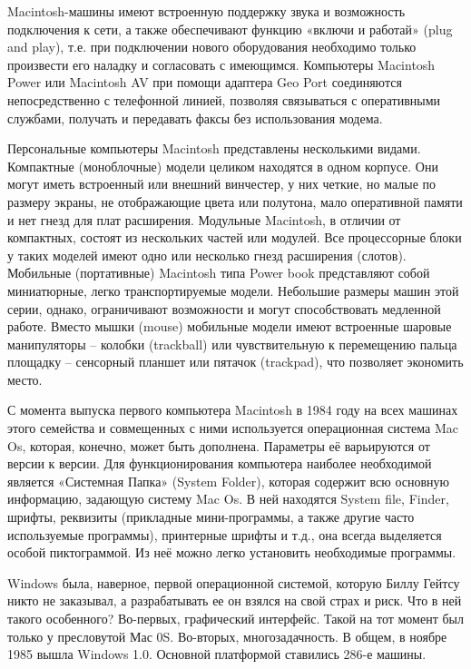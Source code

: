 Macintosh-машины имеют встроенную поддержку звука и возможность подключения к сети, а также обеспечивают функцию «включи и работай» (plug and play), т.е. при подключении нового оборудования необходимо только произвести его наладку и согласовать с имеющимся. Компьютеры Macintosh Power или Macintosh AV при помощи адаптера Geo Port соединяются непосредственно с телефонной линией, позволяя связываться с оперативными службами, получать и передавать факсы без использования модема.

Персональные компьютеры Macintosh представлены несколькими видами. Компактные (моноблочные) модели целиком находятся в одном корпусе. Они могут иметь встроенный или внешний винчестер, у них четкие, но малые по размеру экраны, не отображающие цвета или полутона, мало оперативной памяти и нет гнезд для плат расширения. Модульные Macintosh, в отличии от компактных, состоят из нескольких частей или модулей. Все процессорные блоки у таких моделей имеют одно или несколько гнезд расширения (слотов). Мобильные (портативные) Macintosh типа Power book представляют собой миниатюрные, легко транспортируемые модели. Небольшие размеры машин этой серии, однако, ограничивают возможности и могут способствовать медленной работе. Вместо мышки (mouse) мобильные модели имеют встроенные шаровые манипуляторы – колобки (trackball) или чувствительную к перемещению пальца площадку – сенсорный планшет или пятачок (trackpad), что позволяет экономить место.

С момента выпуска первого компьютера Macintosh в 1984 году на всех машинах этого семейства и совмещенных с ними используется операционная система Mac Os, которая, конечно, может быть дополнена. Параметры её варьируются от версии к версии. Для функционирования компьютера наиболее необходимой является «Системная Папка» (System Folder), которая содержит всю основную информацию, задающую систему Mac Os. В ней находятся System file, Finder, шрифты, реквизиты (прикладные мини-программы, а также другие часто используемые программы), принтерные шрифты и т.д., она всегда выделяется особой пиктограммой. Из неё можно легко установить необходимые программы.



Windows была, наверное, первой операционной системой, которую Биллу Гейтсу никто не заказывал, а разрабатывать ее он взялся на свой страх и риск. Что в ней такого особенного? Во-первых, графический интерфейс. Такой на тот момент был только у пресловутой Мас 0S. Во-вторых, многозадачность. В общем, в ноябре 1985 вышла Windows 1.0. Основной платформой ставились 286-е машины.

